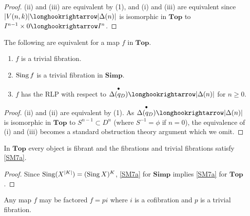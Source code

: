 \documentclass[../main]{subfiles}
\begin{document}
\begin{proof}
(ii) and (iii) are equivalent by (1), and (i) and (iii) are equivalent since $|V(n, k)| \longhookrightarrow |\Delta(n)|$ is isomorphic in $\mathbf{Top}$ to $I^{n - 1} \times 0 \longhookrightarrow I^n$. 
\end{proof}

\begin{lemma}
\label{lem:2.3.2}
The following are equivalent for a map $f$ in $\mathbf{Top}$. 
\begin{enumerate}
    \item[(i)] $f$ is a trivial fibration.
    \item[(ii)] $\operatorname{Sing} f$ is a trivial fibration in $\mathbf{Simp}$.
    \item[(iii)] $f$ has the RLP with respect to $\overset{\bullet}{\Delta(q_D)} \longhookrightarrow |\Delta(n)|$ for $n \ge 0$. 
\end{enumerate} 
\end{lemma} 

\begin{proof}
(ii) and (ii) are equivalent by (1). As $\overset{\bullet}{\Delta(q_D)} \longhookrightarrow |\Delta(n)|$ is isomorphic in $\mathbf{Top}$ to $S^{n - 1} \subset D^n$ (where $S^{-1} = \phi$ if $n = 0$), the equivalence of (i) and (iii) becomes a standard obstruction theory argument which we omit. 
\end{proof} 

\begin{corollary*}
In $\mathbf{Top}$ every object is fibrant and the fibrations and trivial fibrations satisfy \ref{SM7a}.
\end{corollary*}

\begin{proof}
Since $\operatorname{Sing}(X^{|K|}) = (\operatorname{Sing} X)^K$, \ref{SM7a} for $\mathbf{Simp}$ implies \ref{SM7a} for $\mathbf{Top}$. 
\end{proof} 

\begin{lemma}
\label{lem:2.3.3}
Any map $f$ may be factored $f = pi$ where $i$ is a cofibration and $p$ is a trivial fibration. 
\end{lemma} 
\end{document}
